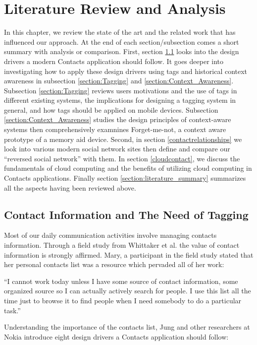 \chapter{Literature Review and Analysis}
In this chapter, we review the state of the art and the related work that has influenced our approach. At the end of each section/subsection comes a short summary with analysis or comparison. First, section \ref{contactprofile} looks into the design drivers a modern Contacts application should follow. It goes deeper into investigating how to apply these design drivers using tags and historical context awareness in subsection \ref{section:Tagging} and \ref{section:Context_Awareness}. Subsection \ref{section:Tagging} reviews users motivations and the use of tags in different existing systems, the implications for designing a tagging system in general, and how tags should be applied on mobile devices. Subsection \ref{section:Context_Awareness} studies the design principles of context-aware systems then comprehensively examnines Forget-me-not, a context aware prototype of a memory aid device. Second, in section \ref{contactrelationships} we look into various modern social network sites then define and compare our ``reversed social network'' with them. In section \ref{cloudcontact}, we discuss the fundamentals of cloud computing and the benefits of utilizing cloud computing in Contacts applications. Finally section \ref{section:literature_summary} summarizes all the aspects having been reviewed above.

\section{Contact Information and The Need of Tagging}\label{contactprofile}
Most of our daily communication activities involve managing contacts information. Through a field study from Whittaker et al. \cite{Whittaker2002} the value of contact information is strongly affirmed. Mary, a participant in the field study stated that her personal contacts list was a resource which pervaded all of her work:

``I cannot work today unless I have some source of contact information, some organized source so I can actually actively search for people. I use this list all the time just to browse it to find people when I need somebody to do a particular task.''\cite{Whittaker2002}

Understanding the importance of the contacts list, Jung and other researchers at Nokia \cite{Jung2008} introduce eight design drivers a Contacts application should follow:

